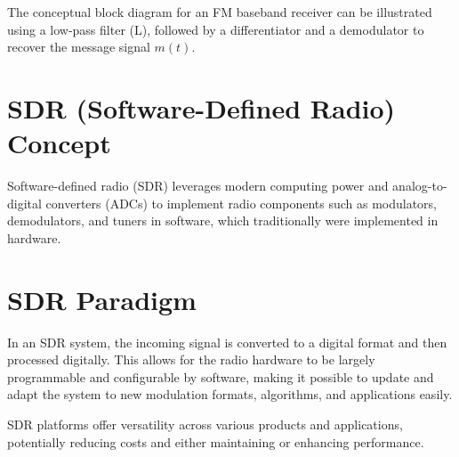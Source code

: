 The conceptual block diagram for an FM baseband receiver can be illustrated using a low-pass filter (L), followed by a differentiator and a demodulator to recover the message signal \( m(t) \).

\section*{SDR (Software-Defined Radio) Concept}

Software-defined radio (SDR) leverages modern computing power and analog-to-digital converters (ADCs) to implement radio components such as modulators, demodulators, and tuners in software, which traditionally were implemented in hardware.

\section*{SDR Paradigm}

In an SDR system, the incoming signal is converted to a digital format and then processed digitally. This allows for the radio hardware to be largely programmable and configurable by software, making it possible to update and adapt the system to new modulation formats, algorithms, and applications easily.

SDR platforms offer versatility across various products and applications, potentially reducing costs and either maintaining or enhancing performance.



